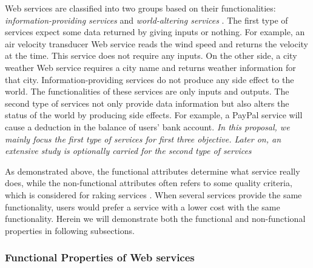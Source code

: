 Web services are classified into two groups based on their functionalities:  \emph{information-providing services} and \emph{world-altering services} \cite{mcilraith2001semantic}. The first type of services expect some data returned by giving inputs or nothing. For example, an air velocity transducer Web service reads the wind speed and returns the velocity at the time. This service does not require any inputs. On the other side, a city weather Web service requires a city name and returns weather information for that city. Information-providing services do not produce any side effect to the world. The functionalities of these services are only inputs and outputs. The second type of services not only provide data information but also alters the status of the world by producing side effects. For example, a PayPal service will cause a deduction in the balance of users' bank account. \emph{In this proposal, we mainly focus the first type of services for first three objective. Later on, an extensive study is optionally carried for the second type of services}

As demonstrated above, the functional attributes determine what service really does, while the non-functional attributes often refers to some quality criteria, which is considered for raking services \cite{agarwal2009making}. When several services provide the same functionality, users would prefer a service with a lower cost with the same functionality. Herein we will demonstrate both the functional and non-functional properties in following subsections.



\subsubsection{Functional Properties of Web services}\label{functional}

